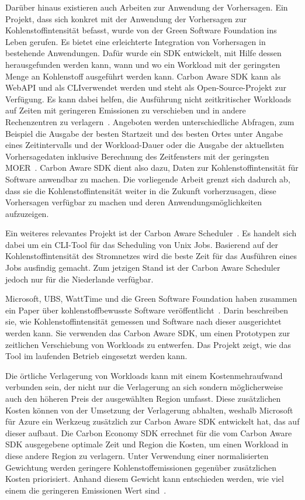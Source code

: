 Darüber hinaus existieren auch Arbeiten zur Anwendung der Vorhersagen.
Ein Projekt, dass sich konkret mit der Anwendung der Vorhersagen zur Kohlenstoffintensität befasst, wurde von der Green Software Foundation ins Leben gerufen.
Es bietet eine erleichterte Integration von Vorhersagen in bestehende Anwendungen.
Dafür wurde ein \ac{SDK} entwickelt, mit Hilfe dessen herausgefunden werden kann, wann und wo ein Workload mit der geringsten Menge an Kohlenstoff ausgeführt werden kann.
Carbon Aware \ac{SDK} kann als Web\ac{API} und als \ac{CLI}verwendet werden und steht als Open-Source-Projekt zur Verfügung.
Es kann dabei helfen, die Ausführung nicht zeitkritischer Workloads auf Zeiten mit geringeren Emissionen zu verschieben und in andere Rechenzentren zu verlagern~\cite{GreenSoftwareFoundation.20231212T09:58:27.000Z}.
Angeboten werden unterschiedliche Abfragen, zum Beispiel die Ausgabe der besten Startzeit und des besten Ortes unter Angabe eines Zeitintervalls und der Workload-Dauer oder die Ausgabe der aktuellsten Vorhersagedaten inklusive Berechnung des Zeitfensters mit der geringsten \ac{MOER}~\cite{GreenSoftwareFoundation.20240316T16:54:58.000Z}.
Carbon Aware \ac{SDK} dient also dazu, Daten zur Kohlenstoffintensität für Software anwendbar zu machen.
Die vorliegende Arbeit grenzt sich dadurch ab, dass sie die Kohlenstoffintensität weiter in die Zukunft vorherzusagen, diese Vorhersagen verfügbar zu machen und deren Anwendungsmöglichkeiten aufzuzeigen.

Ein weiteres relevantes Projekt ist der Carbon Aware Scheduler~\cite{Siemers.20240319T14:09:25.000Z}.
Es handelt sich dabei um ein \ac{CLI}-Tool für das Scheduling von Unix Jobs.
Basierend auf der Kohlenstoffintensität des Stromnetzes wird die beste Zeit für das Ausführen eines Jobs ausfindig gemacht.
Zum jetzigen Stand ist der Carbon Aware Scheduler jedoch nur für die Niederlande verfügbar.

Microsoft, UBS, WattTime und die Green Software Foundation haben zusammen ein Paper über kohlenstoffbewusste Software veröffentlicht~\cite{Buchanan.2023}.
Darin beschreiben sie, wie Kohlenstoffintensität gemessen und Software nach dieser ausgerichtet werden kann.
Sie verwenden das Carbon Aware \ac{SDK}, um einen Prototypen zur zeitlichen Verschiebung von Workloads zu entwerfen.
Das Projekt zeigt, wie das Tool im laufenden Betrieb eingesetzt werden kann.

Die örtliche Verlagerung von Workloads kann mit einem Kostenmehraufwand verbunden sein, der nicht nur die Verlagerung an sich sondern möglicherweise auch den höheren Preis der ausgewählten Region umfasst.
Diese zusätzlichen Kosten können von der Umsetzung der Verlagerung abhalten, weshalb Microsoft für Azure ein Werkzeug zusätzlich zur Carbon Aware \ac{SDK} entwickelt hat, das auf dieser aufbaut.
Die Carbon Economy \ac{SDK} errechnet für die vom Carbon Aware \ac{SDK} ausgegebene optimale Zeit und Region die Kosten, um einen Workload in diese andere Region zu verlagern.
Unter Verwendung einer normalisierten Gewichtung werden geringere Kohlenstoffemissionen gegenüber zusätzlichen Kosten priorisiert.
Anhand diesem Gewicht kann entschieden werden, wie viel einem die geringeren Emissionen Wert sind~\cite{Norlander.2023}.

